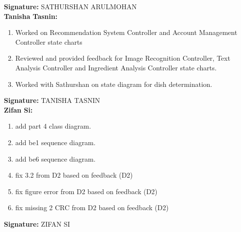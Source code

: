 \documentclass[]{article}
\begin{document}
\textbf{Signature:} SATHURSHAN ARULMOHAN \\

\textbf{Tanisha Tasnin:}
\begin{enumerate}
	\item Worked on Recommendation System Controller and Account Management Controller state charts
 	\item Reviewed and provided feedback for Image Recognition Controller, Text Analysis Controller and Ingredient Analysis Controller state charts.
 	\item Worked with Sathurshan on state diagram for dish determination.
\end{enumerate}

\textbf{Signature:} TANISHA TASNIN \\

\textbf{Zifan Si:}
\begin{enumerate}
	\item add part 4 class diagram.
	\item add be1 sequence diagram.
	\item add be6 sequence diagram.
	\item fix 3.2 from D2 based on feedback (D2)
	\item fix figure error from D2 based on feedback (D2)
	\item fix missing 2 CRC from D2 based on feedback (D2)
\end{enumerate}

\textbf{Signature:} ZIFAN SI  \\
\end{document}
